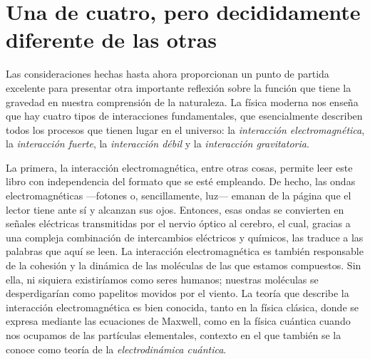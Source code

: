 \section[Una de cuatro, pero diferente]{Una de cuatro, pero decididamente diferente de las otras}\label{sec:01-interactions}

Las consideraciones hechas hasta ahora proporcionan un punto de partida excelente
para presentar otra importante reflexión sobre la función que tiene la gravedad en
nuestra comprensión de la naturaleza. La física moderna nos enseña que hay cuatro
tipos de interacciones fundamentales, que esencialmente describen todos los procesos
que tienen lugar en el universo: la \emph{interacción electromagnética},
la \emph{interacción fuerte}, la
\emph{interacción débil} y la
\emph{interacción gravitatoria}.

La primera, la interacción electromagnética, entre otras cosas, permite leer este libro
con independencia del formato que se esté empleando. De hecho, las ondas
electromagnéticas
---fotones o, sencillamente, luz--- emanan de la página que el lector
tiene ante sí y alcanzan sus ojos. Entonces, esas ondas se convierten en señales
eléctricas transmitidas por el nervio óptico al cerebro, el cual, gracias a una compleja
combinación de intercambios eléctricos y químicos, las traduce a las palabras que aquí
se leen. La interacción electromagnética es también responsable de la cohesión y la
dinámica de las moléculas de las que estamos compuestos. Sin ella, ni siquiera
existiríamos como seres humanos; nuestras moléculas se desperdigarían como papelitos
movidos por el viento. La teoría que describe la interacción electromagnética es bien
conocida, tanto en la física clásica, donde se expresa mediante las ecuaciones de
Maxwell, como en la física cuántica cuando nos ocupamos de las partículas elementales,
contexto en el que también se la conoce como teoría de la \emph{electrodinámica cuántica}.

